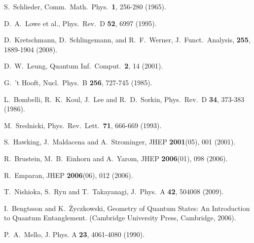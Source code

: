 \documentclass[twocolumn,aps,prl]{revtex4}
\begin{document}
\begin{thebibliography}{16}
 S.\ Schlieder,
Comm.\ Math.\ Phys.\ {\bf 1}, 256-280 (1965).

 D.\ A.\ Lowe {et al.},
Phys.\ Rev.\ D {\bf 52}, 6997 (1995).

 D.\ Kretschmann, D.\ Schlingemann, and R.\ F.\ Werner,
J.\ Funct.\ Analysis, {\bf 255}, 1889-1904 (2008).

 D.\ W.\ Leung,
Quantum Inf.\ Comput.\ {\bf 2}, 14 (2001).

 G.\ 't Hooft,
Nucl.\ Phys.\ B {\bf 256}, 727-745 (1985).

 L.\ Bombelli, R.\ K.\ Koul, J.\ Lee and R.\ D.\ Sorkin,
Phys.\ Rev.\ D {\bf 34}, 373-383 (1986).

 M.\ Srednicki,
Phys.\ Rev.\ Lett.\ {\bf 71}, 666-669 (1993).

 S.\ Hawking, J.\ Maldacena and A.\ Strominger,
JHEP {\bf 2001}(05), 001 (2001).

 R.\ Brustein, M.\ B.\ Einhorn and A.\ Yarom,
JHEP {\bf 2006}(01), 098 (2006).

 R.\ Emparan,
JHEP {\bf 2006}(06), 012 (2006).

 T.\ Nishioka, S.\ Ryu and T.\ Takayanagi,
J.\ Phys.\ A {\bf 42}, 504008 (2009).

 I.\ Bengtsson and K.\ \.{Z}yczkowski,
Geometry of Quantum States: An Introduction to Quantum Entanglement.
(Cambridge University Press, Cambridge, 2006).

 P.\ A.\ Mello,
J. Phys. A {\bf 23}, 4061-4080 (1990).

\end{thebibliography}
\end{document}
